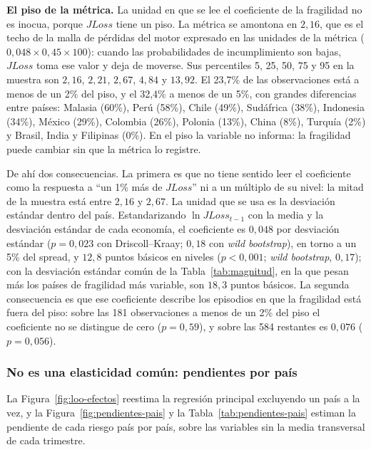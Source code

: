 \textbf{El piso de la métrica.} La unidad en que se lee el coeficiente de la fragilidad no es inocua, porque $JLoss$ tiene un piso. La métrica se amontona en $2{,}16$, que es el techo de la malla de pérdidas del motor expresado en las unidades de la métrica ($0{,}048\times0{,}45\times100$): cuando las probabilidades de incumplimiento son bajas, $JLoss$ toma ese valor y deja de moverse. Sus percentiles 5, 25, 50, 75 y 95 en la muestra son $2{,}16$, $2{,}21$, $2{,}67$, $4{,}84$ y $13{,}92$. El 23,7\% de las observaciones está a menos de un 2\% del piso, y el 32,4\% a menos de un 5\%, con grandes diferencias entre países: Malasia (60\%), Perú (58\%), Chile (49\%), Sudáfrica (38\%), Indonesia (34\%), México (29\%), Colombia (26\%), Polonia (13\%), China (8\%), Turquía (2\%) y Brasil, India y Filipinas (0\%). En el piso la variable no informa: la fragilidad puede cambiar sin que la métrica lo registre.

De ahí dos consecuencias. La primera es que no tiene sentido leer el coeficiente como la respuesta a ``un 1\% más de $JLoss$'' ni a un múltiplo de su nivel: la mitad de la muestra está entre $2{,}16$ y $2{,}67$. La unidad que se usa es la desviación estándar dentro del país. Estandarizando $\ln JLoss_{t-1}$ con la media y la desviación estándar de cada economía, el coeficiente es $0{,}048$ por desviación estándar ($p=0{,}023$ con Driscoll--Kraay; $0{,}18$ con \textit{wild bootstrap}), en torno a un 5\% del spread, y $12{,}8$ puntos básicos en niveles ($p<0{,}001$; \textit{wild bootstrap}, $0{,}17$); con la desviación estándar común de la Tabla~\ref{tab:magnitud}, en la que pesan más los países de fragilidad más variable, son $18{,}3$ puntos básicos. La segunda consecuencia es que ese coeficiente describe los episodios en que la fragilidad está fuera del piso: sobre las 181 observaciones a menos de un 2\% del piso el coeficiente no se distingue de cero ($p=0{,}59$), y sobre las 584 restantes es $0{,}076$ ($p=0{,}056$).

\subsubsection{No es una elasticidad común: pendientes por país}
\label{sec:loo-efectos}

La Figura~\ref{fig:loo-efectos} reestima la regresión principal excluyendo un país a la vez, y la Figura~\ref{fig:pendientes-pais} y la Tabla~\ref{tab:pendientes-pais} estiman la pendiente de cada riesgo país por país, sobre las variables sin la media transversal de cada trimestre.

